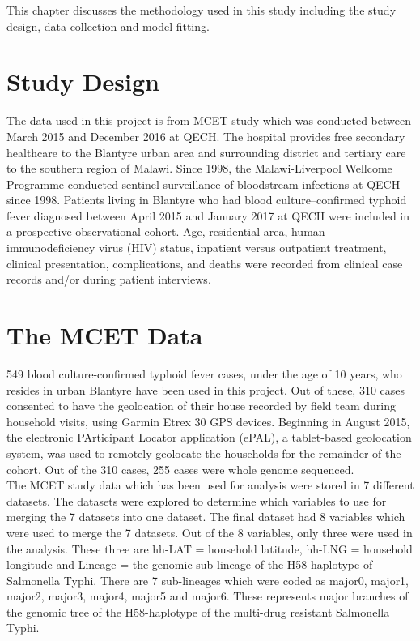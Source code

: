 \documentclass[a4paper]{thesis}
\begin{document}
This chapter discusses the methodology used in this study including the study design, data collection and model fitting.

\section{Study Design}

The data used in this project is from MCET study which was conducted between March 2015 and December 2016 at QECH. The hospital provides free secondary
healthcare to the Blantyre urban area and surrounding
district and tertiary care to the southern region of Malawi. Since 1998, the Malawi-Liverpool Wellcome Programme conducted
sentinel surveillance of bloodstream infections at
QECH since 1998\cite{Musicha}. Patients living in Blantyre who had
blood culture–confirmed typhoid fever diagnosed between
April 2015 and January 2017 at QECH were included in a prospective
observational cohort. Age, residential area, human
immunodeficiency virus (HIV) status, inpatient versus outpatient
treatment, clinical presentation, complications, and deaths
were recorded from clinical case records and/or during patient
interviews.

\section{The MCET Data}

549 blood culture-confirmed typhoid fever cases, under the age of 10 years, who resides in urban Blantyre have been used in this project. Out of these, 310 cases consented to have the geolocation of their house recorded by field
team during household visits, using Garmin Etrex 30 GPS devices. Beginning in August 2015, the electronic PArticipant Locator application (ePAL), a tablet-based geolocation system, was used to remotely geolocate the households for the remainder of the cohort. Out of the 310 cases, 255 cases were whole genome sequenced.\\

The MCET study data which has been used for analysis were stored in 7 different datasets. The datasets were explored to determine which variables to use for merging the 7 datasets into one dataset. The final dataset had 8 variables which were used to merge the 7 datasets. Out of the 8 variables, only three were used in the analysis. These three are hh-LAT = household latitude, hh-LNG = household longitude and Lineage = the genomic sub-lineage of the H58-haplotype of Salmonella Typhi. There are 7 sub-lineages which were coded as major0, major1, major2, major3, major4, major5 and major6. These represents major branches of the genomic tree of the H58-haplotype of the multi-drug resistant Salmonella Typhi.
\end{document}
